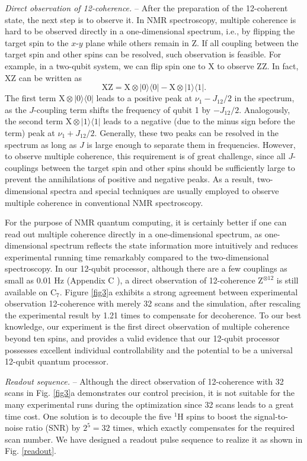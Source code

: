 \documentclass[twocolumn,reprint, amsmath,amssymb,showpacs,superscriptaddress]{revtex4-1}
\newcommand{\be}{\begin{equation}}
\newcommand{\ee}{\end{equation}}
\newcommand{\bra}[1]{\mbox{$\langle #1|$}}
\newcommand{\ket}[1]{\ensuremath{|#1\rangle}}
\begin{document}
\emph{ Direct observation of 12-coherence.} -- After the preparation of the 12-coherent state, the next step is to observe it. In NMR spectroscopy, multiple coherence is hard to be observed directly in a one-dimensional spectrum, i.e., by flipping the target spin to the $x$-$y$ plane while others remain in Z. If all coupling between the target spin and other spins can be resolved, such observation is feasible. For example, in a two-qubit system, we can flip spin one to X to observe ZZ. In fact, XZ can be written as
\be
\text{XZ} = \text{X}\otimes \ket{0}\bra{0} - \text{X}\otimes \ket{1}\bra{1}.
\ee
The first term $\text{X} \otimes \ket{0}\bra{0}$ leads to a positive peak at $\nu_1-J_{12}/2$ in the spectrum, as the $J$-coupling term shifts the frequency of qubit 1 by $-J_{12}/2$. Analogously, the second term $\text{X}\otimes \ket{1}\bra{1}$ leads to a negative (due to the minus sign before the term) peak at $\nu_1+J_{12}/2$. Generally, these two peaks can be resolved in the spectrum as long as $J$ is large enough to separate them in frequencies. However, to observe multiple coherence, this requirement is of great challenge, since all $J$-couplings between the target spin and other spins should be sufficiently large to prevent the annihilations of positive and negative peaks. As a result, two-dimensional spectra and special techniques are usually employed to observe multiple coherence in conventional NMR spectroscopy.

For the purpose of NMR quantum computing, it is certainly better if one can read out multiple coherence directly in a one-dimensional spectrum, as one-dimensional spectrum reflects the state information more intuitively and reduces experimental running time remarkably compared to the two-dimensional spectroscopy. In our 12-qubit processor, although there are a few couplings as small as 0.01 Hz (Appendix C \cite{supple}), a direct observation of 12-coherence $\text{Z}^{\otimes 12}$ is still available on C$_7$. Figure \ref{fig3}a exhibits a strong agreement between experimental observation 12-coherence with merely 32 scans and the simulation, after rescaling the experimental result by 1.21 times to compensate for decoherence. To our best knowledge, our experiment is the first direct observation of multiple coherence beyond ten spins, and provides a valid evidence that our 12-qubit processor possesses excellent individual controllability and the potential to be a universal 12-qubit quantum processor.

\emph{Readout sequence.} -- Although the direct observation of 12-coherence with 32 scans in Fig. \ref{fig3}a demonstrates our control precision, it is not suitable for the many experimental runs during the optimization since 32 scans leads to a great time cost. One solution is to decouple the five $^1$H spins to boost the signal-to-noise ratio (SNR) by $2^5=32$ times, which exactly compensates for the required scan number. We have designed a readout pulse sequence to realize it as shown in Fig. \ref{readout}.
\end{document}
